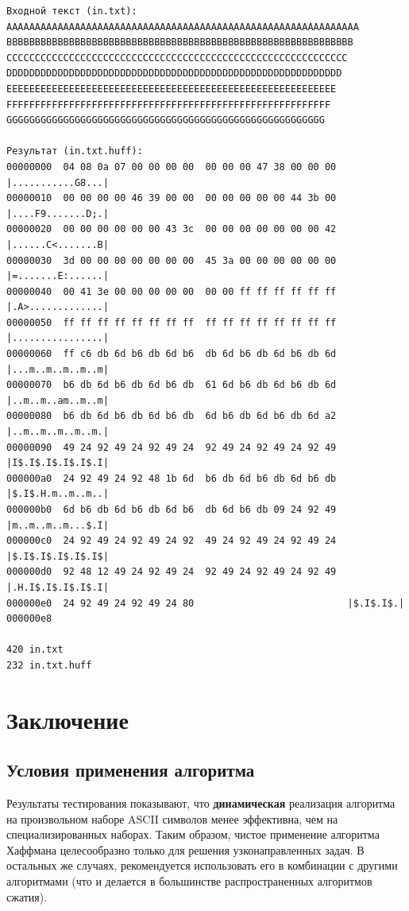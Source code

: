\documentclass[12pt, a4paper]{article}
\begin{document}
\begin{verbatim}
Входной текст (in.txt):
AAAAAAAAAAAAAAAAAAAAAAAAAAAAAAAAAAAAAAAAAAAAAAAAAAAAAAAAAAAAAA
BBBBBBBBBBBBBBBBBBBBBBBBBBBBBBBBBBBBBBBBBBBBBBBBBBBBBBBBBBBBB
CCCCCCCCCCCCCCCCCCCCCCCCCCCCCCCCCCCCCCCCCCCCCCCCCCCCCCCCCCCC
DDDDDDDDDDDDDDDDDDDDDDDDDDDDDDDDDDDDDDDDDDDDDDDDDDDDDDDDDDD
EEEEEEEEEEEEEEEEEEEEEEEEEEEEEEEEEEEEEEEEEEEEEEEEEEEEEEEEEE
FFFFFFFFFFFFFFFFFFFFFFFFFFFFFFFFFFFFFFFFFFFFFFFFFFFFFFFFF
GGGGGGGGGGGGGGGGGGGGGGGGGGGGGGGGGGGGGGGGGGGGGGGGGGGGGGGG

Результат (in.txt.huff):
00000000  04 08 0a 07 00 00 00 00  00 00 00 47 38 00 00 00  |...........G8...|
00000010  00 00 00 00 46 39 00 00  00 00 00 00 00 44 3b 00  |....F9.......D;.|
00000020  00 00 00 00 00 00 43 3c  00 00 00 00 00 00 00 42  |......C<.......B|
00000030  3d 00 00 00 00 00 00 00  45 3a 00 00 00 00 00 00  |=.......E:......|
00000040  00 41 3e 00 00 00 00 00  00 00 ff ff ff ff ff ff  |.A>.............|
00000050  ff ff ff ff ff ff ff ff  ff ff ff ff ff ff ff ff  |................|
00000060  ff c6 db 6d b6 db 6d b6  db 6d b6 db 6d b6 db 6d  |...m..m..m..m..m|
00000070  b6 db 6d b6 db 6d b6 db  61 6d b6 db 6d b6 db 6d  |..m..m..am..m..m|
00000080  b6 db 6d b6 db 6d b6 db  6d b6 db 6d b6 db 6d a2  |..m..m..m..m..m.|
00000090  49 24 92 49 24 92 49 24  92 49 24 92 49 24 92 49  |I$.I$.I$.I$.I$.I|
000000a0  24 92 49 24 92 48 1b 6d  b6 db 6d b6 db 6d b6 db  |$.I$.H.m..m..m..|
000000b0  6d b6 db 6d b6 db 6d b6  db 6d b6 db 09 24 92 49  |m..m..m..m...$.I|
000000c0  24 92 49 24 92 49 24 92  49 24 92 49 24 92 49 24  |$.I$.I$.I$.I$.I$|
000000d0  92 48 12 49 24 92 49 24  92 49 24 92 49 24 92 49  |.H.I$.I$.I$.I$.I|
000000e0  24 92 49 24 92 49 24 80                           |$.I$.I$.|
000000e8

420 in.txt
232 in.txt.huff
\end{verbatim}

\section{Заключение}
\subsection{Условия применения алгоритма}
Результаты тестирования показывают, что \textbf{динамическая} реализация алгоритма
на произвольном наборе ASCII символов менее эффективна, чем на специализированных наборах.
Таким образом, чистое применение алгоритма Хаффмана целесообразно только для решения
узконаправленных задач. В остальных же случаях, рекомендуется использовать его в комбинации
с другими алгоритмами (что и делается в большинстве распространенных
алгоритмов сжатия).
\end{document}

